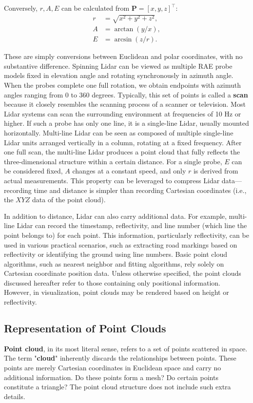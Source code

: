 Conversely, $r, A, E$ can be calculated from $\mathbf{P}=[x,y,z]^\top$:  
\begin{equation}\label{key}  
	\begin{aligned}  
		r &= \sqrt{x^2 + y^2 + z^2}, \\  
		A &= \arctan(y/x), \\  
		E &= \arcsin(z/r).  
	\end{aligned}  
\end{equation}  

These are simply conversions between Euclidean and polar coordinates, with no substantive difference. Spinning Lidar can be viewed as multiple RAE probe models fixed in elevation angle and rotating synchronously in azimuth angle.  
When the probes complete one full rotation, we obtain endpoints with azimuth angles ranging from 0 to 360 degrees. Typically, this set of points is called a \textbf{scan} because it closely resembles the scanning process of a scanner or television. Most Lidar systems can scan the surrounding environment at frequencies of 10 Hz or higher. If such a probe has only one line, it is a single-line Lidar, usually mounted horizontally. Multi-line Lidar can be seen as composed of multiple single-line Lidar units arranged vertically in a column, rotating at a fixed frequency. After one full scan, the multi-line Lidar produces a point cloud that fully reflects the three-dimensional structure within a certain distance. For a single probe, $E$ can be considered fixed, $A$ changes at a constant speed, and only $r$ is derived from actual measurements. This property can be leveraged to compress Lidar data—recording time and distance is simpler than recording Cartesian coordinates (i.e., the $XYZ$ data of the point cloud).  

In addition to distance, Lidar can also carry additional data. For example, multi-line Lidar can record the timestamp, reflectivity, and line number (which line the point belongs to) for each point. This information, particularly reflectivity, can be used in various practical scenarios, such as extracting road markings based on reflectivity or identifying the ground using line numbers. Basic point cloud algorithms, such as nearest neighbor and fitting algorithms, rely solely on Cartesian coordinate position data. Unless otherwise specified, the point clouds discussed hereafter refer to those containing only positional information. However, in visualization, point clouds may be rendered based on height or reflectivity.

\subsection{Representation of Point Clouds}  
\textbf{Point cloud}, in its most literal sense, refers to a set of points scattered in space. The term "\textbf{cloud}" inherently discards the relationships between points. These points are merely Cartesian coordinates in Euclidean space and carry no additional information. Do these points form a mesh? Do certain points constitute a triangle? The point cloud structure does not include such extra details.  

